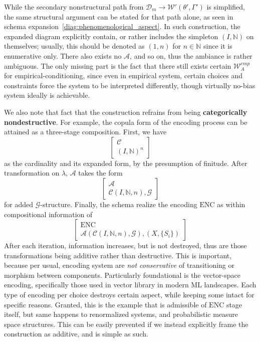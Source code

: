 While the secondary nonstructural path from $\mathcal{D}_{m}\to\mathcal{W}'(\theta',\Gamma')$ is simplified, the same structural argument can be stated for that path alone, as seen in schema expansion~\ref{diag:phenomenological_aspect}. In such construction, the expanded diagram explicitly contain, or rather includes the simpleton $(I,\mathbb{N})$ on themselves; usually, this should be denoted as $(1,n)$ for $n\in\mathbb{N}$ since it is enumerative only. There also exists no $\mathcal{A}$, and so on, thus the ambiance is rather ambiguous. The only missing part is the fact that there still exists certain $\mathcal{W}_{A}^{emp}$ for empirical-conditioning, since even in empirical system, certain choices and constraints force the system to be interpreted differently, though virtually no-bias system ideally is achievable. 

We also note that fact that the construction refrains from being \textbf{categorically nondestructive}. For example, the copula form of the encoding process can be attained as a three-stage composition. First, we have
\begin{equation}
		\begin{bmatrix}
		\mathcal{C}\\
		(I,\mathbb{N})^{n}
	\end{bmatrix}
\end{equation}
as the cardinality and its expanded form, by the presumption of finitude. After transformation on $\lambda$, $\mathcal{A}$ takes the form
\begin{equation}
	\begin{bmatrix}
		\mathcal{A}\\
		\mathcal{C}(I,\mathbb{N},n),\mathcal{G}
	\end{bmatrix}
\end{equation}
for added $\mathcal{G}$-structure. Finally, the schema realize the encoding $\mathrm{ENC}$ as within compositional information of
\begin{equation}
	\begin{bmatrix}
		\mathrm{ENC}\\
		\mathcal{A}(\mathcal{C}(I,\mathbb{N},n),\mathcal{G}),(X,\{S_{i}\})
	\end{bmatrix}
\end{equation}
After each iteration, information increases, but is not destroyed, thus are those transformations being additive rather than destructive. This is important, because per usual, encoding system are \textit{not conservative} of transitioning or morphism between components. Particularly foundational is the vector-space encoding, specifically those used in vector library in modern ML landscapes. Each type of encoding per choice destroys certain aspect, while keeping some intact for specific reasons. Granted, this is the example that is admissible of $\mathrm{ENC}$ stage itself, but same happens to renormalized systems, and probabilistic measure space structures. This can be easily prevented if we instead explicitly frame the construction as additive, and is simple as such. 

